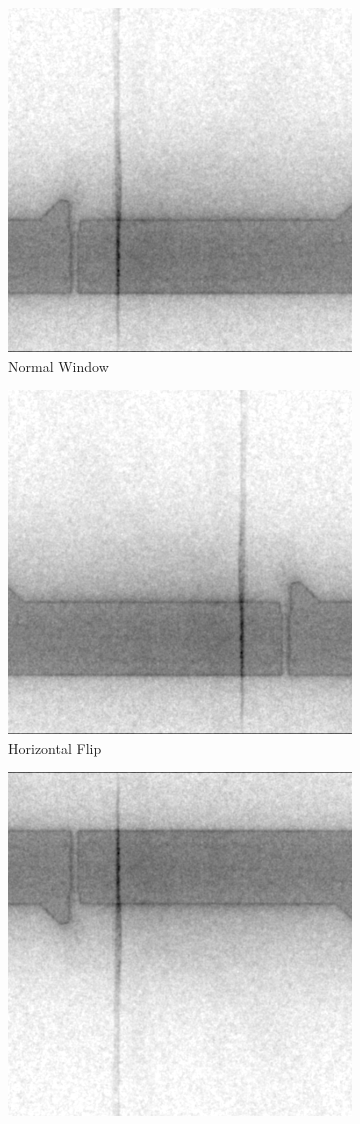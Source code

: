 \begin{figure}[!h]
\centering
\begin{subfigure}{.5\textwidth}
  \centering
  \includegraphics[width=.5\linewidth]{images/implementation/augmentations/flip_og}
  \caption{Normal Window}
\end{subfigure}%
\begin{subfigure}{.5\textwidth}
  \centering
  \includegraphics[width=.5\linewidth]{images/implementation/augmentations/flip_lr}
  \caption{Horizontal Flip}
\end{subfigure}
\begin{subfigure}{.5\textwidth}
  \centering
  \includegraphics[width=.5\linewidth]{images/implementation/augmentations/flip_ud}

\end{subfigure}
\end{figure}
